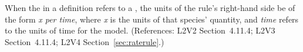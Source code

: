 When the  in a \RateRule definition refers to a \Species,
the units of the rule's right-hand side  be of the form \emph{x per
time}, where \emph{x} is the units of that species' quantity, and
\emph{time} refers to the units of time for the model.  (References: L2V2
Section~4.11.4; L2V3 Section~4.11.4; L2V4 Section~\ref{sec:raterule}.)
